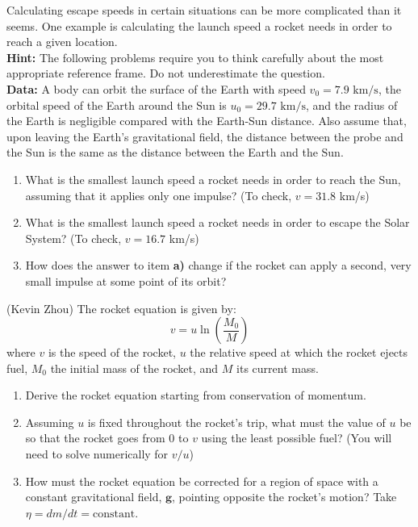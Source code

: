 \documentclass[11pt]{article}
\begin{document}
\begin{pproblem} Calculating escape speeds in certain situations can be more complicated than it seems. One example is calculating the launch speed a rocket needs in order to reach a given location.
    \\
    \textbf{Hint:} The following problems require you to think carefully about the most appropriate reference frame. Do not underestimate the question.
    \\
    \textbf{Data:} A body can orbit the surface of the Earth with speed \(v_0 = 7.9\text{ km/s}\), the orbital speed of the Earth around the Sun is \(u_0 = 29.7\text{ km/s}\), and the radius of the Earth is negligible compared with the Earth-Sun distance. Also assume that, upon leaving the Earth's gravitational field, the distance between the probe and the Sun is the same as the distance between the Earth and the Sun.
    \begin{enumerate}[label=\textbf{\alph*)}]
        \item What is the smallest launch speed a rocket needs in order to reach the Sun, assuming that it applies only one impulse? (To check, \(v = 31.8\) km/s)
        \item What is the smallest launch speed a rocket needs in order to escape the Solar System? (To check, \(v = 16.7\) km/s)
        \item How does the answer to item \textbf{a)} change if the rocket can apply a second, very small impulse at some point of its orbit?
    \end{enumerate}

    
\end{pproblem}

\begin{pproblem} (Kevin Zhou) The rocket equation is given by:
    \[
    v = u\ln\left(\frac{M_0}{M}\right)
    \]
    where \(v\) is the speed of the rocket, \(u\) the relative speed at which the rocket ejects fuel, \(M_0\) the initial mass of the rocket, and \(M\) its current mass.
    \begin{enumerate}[label=\textbf{\alph*)}]
        \item Derive the rocket equation starting from conservation of momentum.
        \item Assuming \(u\) is fixed throughout the rocket's trip, what must the value of \(u\) be so that the rocket goes from \(0\) to \(v\) using the least possible fuel? (You will need to solve numerically for \(v/u\))
        \item How must the rocket equation be corrected for a region of space with a constant gravitational field, \(\mathbf{g}\), pointing opposite the rocket's motion? Take \(\eta = dm/dt = \text{constant}\).
    \end{enumerate}

    
\end{pproblem}  
\end{document}
